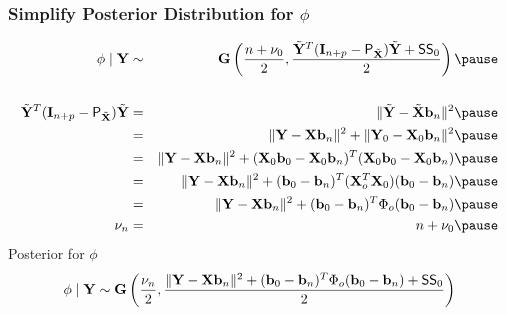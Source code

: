 \documentclass[handout]{beamer}\usepackage[]{graphicx}\usepackage[]{color}
\begin{document}
\begin{frame}
  \frametitle{Simplify Posterior Distribution for $\phi$}
  \begin{eqnarray*}
  \phi \mid \Y & \sim & \G\left(\frac{n + \nu_0}{2},  \frac{\tY^T (\I_{n +p}
  -\P_{\tX}) \tY +  \SS_0}{ 2} \right) \pause \\
& & \\
\tY^T (\I_{n +p}   -\P_{\tX}) \tY & = & \| \tY - \tX \bv_n \|^2 \pause \\
& = &  \| \Y - \X \bv_n \|^2 +  \| \Y_0 - \X_0 \bv_n \|^2 \pause \\
& = &  \| \Y - \X \bv_n \|^2 +  (\X_0\bv_0 - \X_0 \bv_n)^T  (\X_0\bv_0
- \X_0 \bv_n) \pause \\
& = &  \| \Y - \X \bv_n \|^2 +  (\bv_0 - \bv_n)^T(\X_o^T\X_0)(\bv_0
- \bv_n) \pause \\
& = &  \| \Y - \X \bv_n \|^2 +  (\bv_0 - \bv_n)^T\Phi_o(\bv_0
- \bv_n) \pause\\
\nu_n & = & n + \nu_0\pause \\
\end{eqnarray*}
Posterior for $\phi$
$$ \phi \mid \mathbf{Y} \sim \mathbf{G}\left(\frac{\nu_n}{2},  \frac{\| \mathbf{Y} - \mathbf{X} \mathbf{b}_n \|^2 +  (\mathbf{b}_0 - \mathbf{b}_n)^T\Phi_o(\mathbf{b}_0
- \mathbf{b}_n) +  \textsf{SS}_0}{ 2} \right) $$
\end{frame}
\end{document}
